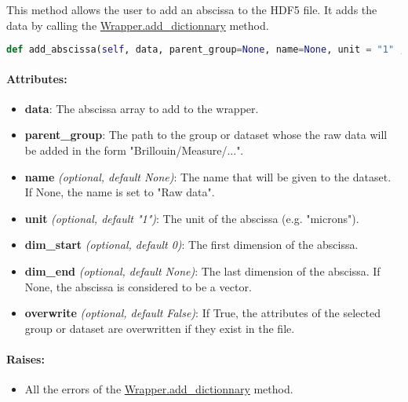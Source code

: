 This method allows the user to add an abscissa to the HDF5 file. It adds the data by calling the \hyperref[subsec:wrapper.add_dictionnary]{Wrapper.add\_dictionnary} method.

\begin{lstlisting}[language=Python]
def add_abscissa(self, data, parent_group=None, name=None, unit = "1" , dim_start = 0, dim_end = None, overwrite = False):
\end{lstlisting}

\paragraph{Attributes:}

\begin{itemize}
    \item \textbf{data}: The abscissa array to add to the wrapper. 
    \item \textbf{parent\_group}: The path to the group or dataset whose the raw data will be added in the form "Brillouin/Measure/...".
    \item \textbf{name} \textit{(optional, default None)}: The name that will be given to the dataset. If None, the name is set to "Raw data".
    \item \textbf{unit} \textit{(optional, default "1")}: The unit of the abscissa (e.g. "microns").
    \item \textbf{dim\_start} \textit{(optional, default 0)}: The first dimension of the abscissa.
    \item \textbf{dim\_end} \textit{(optional, default None)}: The last dimension of the abscissa. If None, the abscissa is considered to be a vector.
    \item \textbf{overwrite} \textit{(optional, default False)}: If True, the attributes of the selected group or dataset are overwritten if they exist in the file.
\end{itemize}

\paragraph{Raises:}
\begin{itemize}
    \item All the errors of the \hyperref[subsec:wrapper.add_dictionnary]{Wrapper.add\_dictionnary} method.
\end{itemize}

